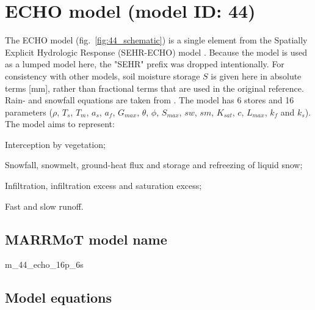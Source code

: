 \section{ECHO model (model ID: 44)}
The ECHO model (fig.~\ref{fig:44_schematic}) is a single element from the Spatially Explicit Hydrologic Response (SEHR-ECHO) model \citep{Schaefli2014}. Because the model is used as a lumped model here, the "SEHR" prefix was dropped intentionally. For consistency with other models, soil moisture storage $S$ is given here in absolute terms [mm], rather than fractional terms that are used in the original reference. Rain- and snowfall equations are taken from \citet{Schaefli2005}. The model has 6 stores and 16 parameters ($\rho$, $T_s$, $T_m$, $a_s$, $a_f$, $G_{max}$, $\theta$, $\phi$, $S_{max}$, $sw$, $sm$, $K_{sat}$, $c$, $L_{max}$, $k_f$ and $k_s$). The model aims to represent:

\begin{itemizecompact}
\item Interception by vegetation;
\item Snowfall, snowmelt, ground-heat flux and storage and refreezing of liquid snow;
\item Infiltration, infiltration excess and saturation excess;
\item Fast and slow runoff.
\end{itemizecompact}

\subsection{MARRMoT model name}
m\_44\_echo\_16p\_6s \\

\subsection{Model equations}

